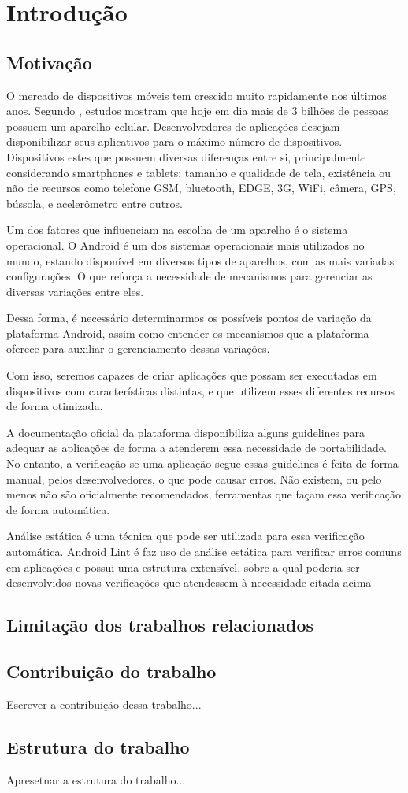 \chapter{Introdução}

\section{Motivação}
O mercado de dispositivos móveis tem crescido muito rapidamente nos últimos anos.
Segundo \cite{lecheta}, estudos mostram que hoje em dia mais de 3 bilhões de pessoas
possuem um aparelho celular. Desenvolvedores de aplicações desejam disponibilizar
seus aplicativos para o máximo número de dispositivos. Dispositivos estes que
possuem diversas diferenças entre si, principalmente considerando smartphones e
tablets: tamanho e qualidade de tela, existência ou não de recursos como telefone
GSM, bluetooth, EDGE, 3G, WiFi, câmera, GPS, bússola, e acelerômetro entre outros.

Um dos fatores que influenciam na escolha de um aparelho é o sistema operacional.
O Android é um dos sistemas operacionais mais utilizados no mundo, estando 
disponível em diversos tipos de aparelhos, com as mais variadas configurações.
O que reforça a necessidade de mecanismos para gerenciar as diversas variações entre 
eles.

Dessa forma, é necessário determinarmos os possíveis pontos de variação da plataforma
Android, assim como entender os mecanismos que a plataforma oferece para auxiliar
o gerenciamento dessas variações. 

Com isso, seremos capazes de criar aplicações que possam ser executadas em dispositivos
com características distintas, e que utilizem esses diferentes recursos de forma otimizada.

A documentação oficial da plataforma disponibiliza alguns guidelines para adequar
as aplicações de forma a atenderem essa necessidade de portabilidade. No entanto, 
a verificação se uma aplicação segue essas guidelines é feita de forma manual, pelos
desenvolvedores, o que pode causar erros. Não existem, ou pelo menos não são
oficialmente recomendados, ferramentas que façam essa verificação de forma automática.

Análise estática é uma técnica que pode ser utilizada para essa
verificação automática. Android Lint é faz uso de análise estática para verificar
erros comuns em aplicações e possui uma estrutura extensível, sobre a qual poderia
ser desenvolvidos novas verificações que atendessem à necessidade citada acima

\section{Limitação dos trabalhos relacionados}


\section{Contribuição do trabalho}
Escrever a contribuição dessa trabalho...

\section{Estrutura do trabalho}
Apresetnar a estrutura do trabalho...
